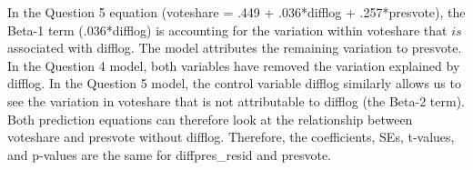\documentclass[12pt,letterpaper]{article}
\begin{document}
\begin{enumerate}
In the Question 5 equation (voteshare = .449 + .036*difflog + .257*presvote), the Beta-1 term (.036*difflog) is accounting for the variation within voteshare that $is$ associated with difflog. The model attributes the remaining variation to presvote. In the Question 4 model, both variables have removed the variation explained by difflog. In the Question 5 model, the control variable difflog similarly allows us to see the variation in voteshare that is not attributable to difflog (the Beta-2 term). Both prediction equations can therefore look at the relationship between voteshare and presvote without difflog. Therefore, the coefficients, SEs, t-values, and p-values are the same for diffpres\_resid and presvote.
	\end{enumerate}
\end{document}

